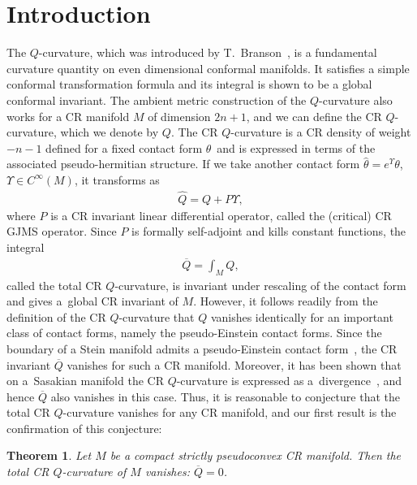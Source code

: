 \documentclass[pdftex]{sigma}
\numberwithin{equation}{section}
\newtheorem{Theorem}{Theorem}[section]
\begin{document}
\section{Introduction}
The $Q$-curvature, which was introduced by T.~Branson~\cite{Branson}, is a fundamental curvature quantity on even dimensional conformal manifolds. It satisf\/ies a simple conformal transformation formula and its integral is shown to be a global conformal invariant. The ambient metric construction of the $Q$-curvature \cite{Fefferman/Hirachi} also works for a CR manifold $M$ of dimension $2n+1$, and we can def\/ine the CR $Q$-curvature, which we denote by $Q$. The CR $Q$-curvature is a CR density of weight $-n-1$ def\/ined for a f\/ixed contact form $\theta$\, and is expressed in terms of the associated pseudo-hermitian structure. If we take another contact form $\widehat\theta=e^\Upsilon\theta$, $\Upsilon\in C^\infty(M)$, it transforms as
\begin{gather*}
\widehat Q=Q+P\Upsilon,
\end{gather*}
where $P$ is a CR invariant linear dif\/ferential operator, called the (critical) CR GJMS operator. Since $P$ is formally self-adjoint and kills constant functions, the integral
\begin{gather*}
\overline{Q}=\int_M Q,
\end{gather*}
called the total CR $Q$-curvature, is invariant under rescaling of the contact form and gives a~global CR invariant of $M$. However, it follows readily from the def\/inition of the CR $Q$-curvature that $Q$ vanishes identically for an important class of contact forms, namely the pseudo-Einstein contact forms. Since the boundary of a Stein manifold admits a pseudo-Einstein contact form~\cite{Cao/Chang}, the CR invariant $\overline{Q}$ vanishes for such a CR manifold. Moreover, it has been shown that on a~Sasakian manifold the CR $Q$-curvature is expressed as a~divergence~\cite{Alexakis/Hirachi}, and hence $\overline{Q}$ also vanishes in this case. Thus, it is reasonable to conjecture that the total CR $Q$-curvature vanishes for any CR manifold, and our f\/irst result is the conf\/irmation of this conjecture:

\begin{Theorem}\label{van-total-CR-Q}
Let $M$ be a compact strictly pseudoconvex CR manifold. Then the total CR $Q$-curvature of $M$ vanishes: $\overline{Q}=0$.
\end{Theorem}
\end{document}
